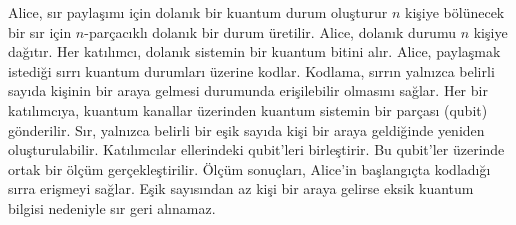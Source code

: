 Alice, sır paylaşımı için dolanık bir kuantum durum oluşturur $n$ kişiye bölünecek bir sır için $n$-parçacıklı dolanık bir durum üretilir. Alice, dolanık durumu $n$ kişiye dağıtır. Her katılımcı, dolanık sistemin bir kuantum bitini alır. Alice, paylaşmak istediği sırrı kuantum durumları üzerine kodlar. Kodlama, sırrın yalnızca belirli sayıda kişinin bir araya gelmesi durumunda erişilebilir olmasını sağlar. Her bir katılımcıya, kuantum kanallar üzerinden kuantum sistemin bir parçası (qubit) gönderilir. Sır, yalnızca belirli bir eşik sayıda kişi bir araya geldiğinde yeniden oluşturulabilir. Katılımcılar ellerindeki qubit'leri birleştirir. Bu qubit'ler üzerinde ortak bir ölçüm gerçekleştirilir. Ölçüm sonuçları, Alice'in başlangıçta kodladığı sırra erişmeyi sağlar. Eşik sayısından az kişi bir araya gelirse eksik kuantum bilgisi nedeniyle sır geri alınamaz.

\newpage